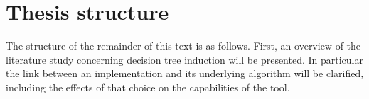 \section{Thesis structure}
The structure of the remainder of this text is as follows. First, an overview of the literature study concerning decision tree induction will be presented. In particular the link between an implementation and its underlying algorithm will be clarified, including the effects of that choice on the capabilities of the tool.

